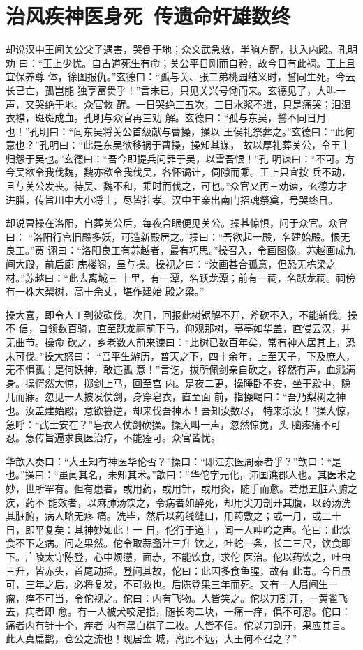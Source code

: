 \chapter{治风疾神医身死~传遗命奸雄数终}

却说汉中王闻关公父子遇害，哭倒于地；众文武急救，半晌方醒，扶入内殿。孔明劝
曰：“王上少忧。自古道死生有命；关公平日刚而自矜，故今日有此祸。王上且宜保养尊
体，徐图报仇。”玄德曰：“孤与关、张二弟桃园结义时，誓同生死。今云长已亡，孤岂能
独享富贵乎！”言未已，只见关兴号恸而来。玄德见了，大叫一声，又哭绝于地。众官救
醒。一日哭绝三五次，三日水浆不进，只是痛哭；泪湿衣襟，斑斑成血。孔明与众官再三劝
解。玄德曰：“孤与东吴，誓不同日月也！”孔明曰：“闻东吴将关公首级献与曹操，操以
王侯礼祭葬之。”玄德曰：“此何意也？”孔明曰：“此是东吴欲移祸于曹操，操知其谋，
故以厚礼葬关公，令王上归怨于吴也。”玄德曰：“吾今即提兵问罪于吴，以雪吾恨！”孔
明谏曰：“不可。方今吴欲令我伐魏，魏亦欲令我伐吴，各怀谲计，伺隙而乘。王上只宜按
兵不动，且与关公发丧。待吴、魏不和，乘时而伐之，可也。”众官又再三劝谏，玄德方才
进膳，传旨川中大小将士，尽皆挂孝。汉中王亲出南门招魂祭奠，号哭终日。

却说曹操在洛阳，自葬关公后，每夜合眼便见关公。操甚惊惧，问于众官。众官曰：
“洛阳行宫旧殿多妖，可造新殿居之。”操曰：“吾欲起一殿，名建始殿。恨无良工。”贾
诩曰：“洛阳良工有苏越者，最有巧思。”操召入，令画图像。苏越画成九间大殿，前后廊
庑楼阁，呈与操。操视之曰：“汝画甚合孤意，但恐无栋梁之材。”苏越曰：“此去离城三
十里，有一潭，名跃龙潭；前有一祠，名跃龙祠。祠傍有一株大梨树，高十余丈，堪作建始
殿之梁。”

操大喜，即令人工到彼砍伐。次日，回报此树锯解不开，斧砍不入，不能斩伐。操不
信，自领数百骑，直至跃龙祠前下马，仰观那树，亭亭如华盖，直侵云汉，并无曲节。操命
砍之，乡老数人前来谏曰：“此树已数百年矣，常有神人居其上，恐未可伐。”操大怒曰：
“吾平生游历，普天之下，四十余年，上至天子，下及庶人，无不惧孤；是何妖神，敢违孤
意！”言讫，拔所佩剑亲自砍之，铮然有声，血溅满身。操愕然大惊，掷剑上马，回至宫
内。是夜二更，操睡卧不安，坐于殿中，隐几而寐。忽见一人披发仗剑，身穿皂衣，直至面
前，指操喝曰：“吾乃梨树之神也。汝盖建始殿，意欲篡逆，却来伐吾神木！吾知汝数尽，
特来杀汝！”操大惊，急呼：“武士安在？”皂衣人仗剑砍操。操大叫一声，忽然惊觉，头
脑疼痛不可忍。急传旨遍求良医治疗，不能痊可。众官皆忧。

华歆入奏曰：“大王知有神医华伦否？”操曰：“即江东医周泰者乎？”歆曰：“是
也。”操曰：“虽闻其名，未知其术。”歆曰：“华佗字元化，沛国谯郡人也。其医术之
妙，世所罕有。但有患者，或用药，或用针，或用灸，随手而愈。若患五脏六腑之疾，药不
能效者，以麻肺汤饮之，令病者如醉死，却用尖刀剖开其腹，以药汤洗其脏腑，病人略无疼
痛。洗毕，然后以药线缝口，用药敷之；或一月，或二十日，即平复矣：其神妙如此！一
日，佗行于道上，闻一人呻吟之声。佗曰：此饮食不下之病。问之果然。佗令取蒜齑汁三升
饮之，吐蛇一条，长二三尺，饮食即下。广陵太守陈登，心中烦懑，面赤，不能饮食，求佗
医治。佗以药饮之，吐虫三升，皆赤头，首尾动摇。登问其故，佗曰：此因多食鱼腥，故有
此毒。今日虽可，三年之后，必将复发，不可救也。后陈登果三年而死。又有一人眉间生一
瘤，痒不可当，令佗视之。佗曰：内有飞物。人皆笑之。佗以刀割开，一黄雀飞去，病者即
愈。有一人被犬咬足指，随长肉二块，一痛一痒，俱不可忍。佗曰：痛者内有针十个，痒者
内有黑白棋子二枚。人皆不信。佗以刀割开，果应其言。此人真扁鹊，仓公之流也！现居金
城，离此不远，大王何不召之？”

